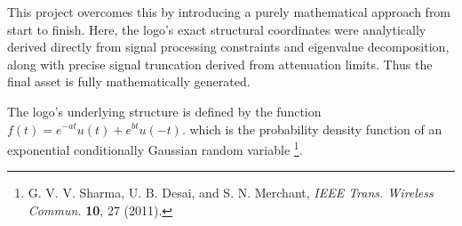 \documentclass{article}
\numberwithin{equation}{section}
\numberwithin{figure}{section}
\begin{document}
This project overcomes this by introducing a purely mathematical approach from start to finish. Here, the logo's exact structural coordinates were analytically derived directly from signal processing constraints and eigenvalue decomposition, along with precise signal truncation derived from attenuation limits. Thus the final asset is fully mathematically generated.

The logo's underlying structure is defined by the function $f(t) = e^{-at}u(t) + e^{bt}u(-t)$. 
which is the probability density function of an exponential conditionally Gaussian random variable
\footnote{G. V. V. Sharma, U. B. Desai, and S. N. Merchant, \emph{IEEE Trans. Wireless Commun.} \textbf{10}, 27 (2011).}.
\end{document}
